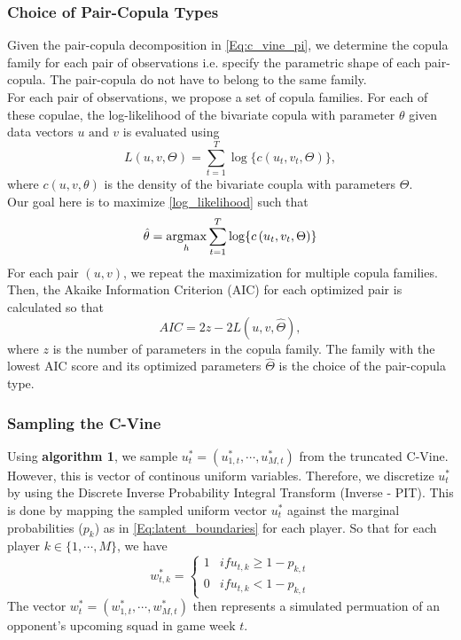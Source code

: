 				\subsubsection{Choice of Pair-Copula Types}
				Given the pair-copula decomposition in \ref{Eq:c_vine_pi}, we determine the copula family for each pair of observations i.e. specify the parametric shape of each pair-copula. The pair-copula do not have to belong to the same family.\\
				For each pair of observations, we propose a set of copula families. For each of these copulae, the log-likelihood of the bivariate copula with parameter $\theta$ given data vectors $u \text{ and } v$ is evaluated using
				\begin{equation}\label{log_likelihood}
					L\left(u, v,\Theta \right) = \sum_{t=1}^{T} \log \{c\left( u_t, v_t, \Theta \right)\},
				\end{equation}
				where $c\left(u,v,\theta \right)$ is the density of the bivariate coupla with parameters $\Theta$.\\
				Our goal here is to maximize \ref{log_likelihood} such that
				\begin{equation}
					\hat{\theta} = \operatorname*{argmax}_{h} \sum_{t=1}^{T} \log \{c \left(u_t,v_t,\Theta \right) \}
				\end{equation}
				For each pair $\left(u,v\right)$, we repeat the maximization for multiple copula families. Then, the Akaike Information Criterion (AIC) for each optimized pair is calculated so that
				\begin{equation}
					AIC = 2z - 2L\left(u,v, \hat{\Theta}\right),
				\end{equation}
				where $z$ is the number of parameters in the copula family.
				The family with the lowest AIC score and its optimized parameters $\hat{\Theta}$ is the choice of the pair-copula type.

				\subsubsection{Sampling the C-Vine}
				Using \textbf{algorithm 1}, we sample $u_t^* = (u_{1,t}^*, \cdots, u_{M,t}^*)$ from the truncated C-Vine. However, this is vector of continous uniform variables. Therefore, we discretize $u_t^*$ by using the Discrete Inverse Probability Integral Transform (Inverse - PIT).
				This is done by mapping the sampled uniform vector $u_t^*$ against the marginal probabilities ($p_k$) as in \ref{Eq:latent_boundaries} for each player. So that for each player $k \in \{1, \cdots, M\}$, we have
				\begin{equation}
					w^*_{t,k} =
					\begin{cases}
						1 & if u_{t,k} \geqslant 1 - p_{k,t}\\
						0 & if u_{t,k} < 1 - p_{k,t}
					\end{cases}
				\end{equation}
				The vector $w^*_{t} = \left(w^*_{1,t}, \cdots, w^*_{M,t} \right)$ then represents a simulated permuation of an opponent's upcoming squad in game week $t$.

